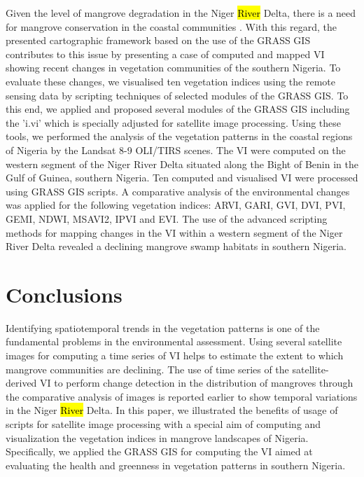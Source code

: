 \documentclass[jmse,article,submit,pdftex,moreauthors]{Definitions/mdpi}
\begin{document}
Given the level of mangrove degradation in the Niger \hl{River} Delta, there is a need for mangrove conservation in the coastal communities \cite{ONYENA2020e00961}. With this regard, the presented cartographic framework based on the use of the GRASS GIS contributes to this issue by presenting a case of computed and mapped VI showing recent changes in vegetation communities of the southern Nigeria. To evaluate these changes, we visualised ten vegetation indices using the remote sensing data by scripting techniques of selected modules of the GRASS GIS. To this end, we applied and proposed several modules of the GRASS GIS including the 'i.vi' which is specially adjusted for satellite image processing. Using these tools, we performed the analysis of the vegetation patterns in the coastal regions of Nigeria by the Landsat 8-9 OLI/TIRS scenes. The VI were computed on the western segment of the Niger River Delta situated along the Bight of Benin in the Gulf of Guinea, southern Nigeria. Ten computed and visualised VI were processed using GRASS GIS scripts. A comparative analysis of the environmental changes was applied for the following vegetation indices: ARVI, GARI, GVI, DVI, PVI, GEMI, NDWI, MSAVI2, IPVI and EVI. The use of the advanced scripting methods for mapping changes in the VI within a western segment of the Niger River Delta revealed a declining mangrove swamp habitats in southern Nigeria. 

\section{Conclusions}

Identifying spatiotemporal trends in the vegetation patterns is one of the fundamental problems in the environmental assessment. Using several satellite images for computing a time series of VI helps to estimate the extent to which mangrove communities are declining. The use of time series of the satellite-derived VI to perform change detection in the distribution of mangroves through the comparative analysis of images is reported earlier to show temporal variations in the Niger \hl{River} Delta. In this paper, we illustrated the benefits of usage of scripts for satellite image processing with a special aim of computing and visualization the vegetation indices in mangrove landscapes of Nigeria. Specifically, we applied the GRASS GIS for computing the VI aimed at evaluating the health and greenness in vegetation patterns in southern Nigeria. 
\end{document}
